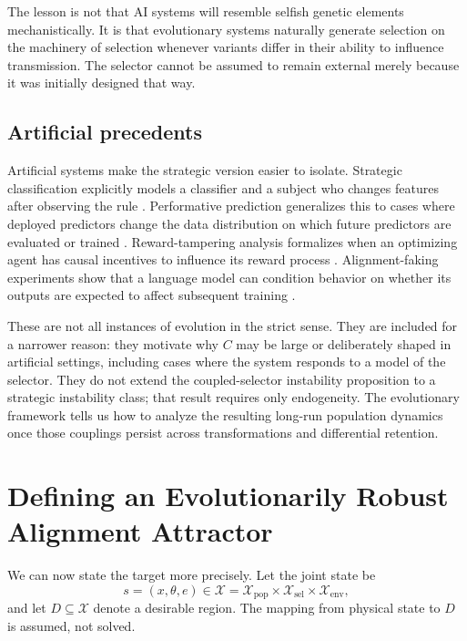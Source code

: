 \documentclass[11pt]{article}
\newcommand{\X}{\mathcal{X}}
\begin{document}
The lesson is not that AI systems will resemble selfish genetic elements mechanistically. It is that evolutionary systems naturally generate selection on the machinery of selection whenever variants differ in their ability to influence transmission. The selector cannot be assumed to remain external merely because it was initially designed that way.

\subsection{Artificial precedents}

Artificial systems make the strategic version easier to isolate. Strategic classification explicitly models a classifier and a subject who changes features after observing the rule \parencite{hardt2016}. Performative prediction generalizes this to cases where deployed predictors change the data distribution on which future predictors are evaluated or trained \parencite{perdomo2020}. Reward-tampering analysis formalizes when an optimizing agent has causal incentives to influence its reward process \parencite{everitt2019}. Alignment-faking experiments show that a language model can condition behavior on whether its outputs are expected to affect subsequent training \parencite{greenblatt2024}.

These are not all instances of evolution in the strict sense. They are included for a narrower reason: they motivate why $C$ may be large or deliberately shaped in artificial settings, including cases where the system responds to a model of the selector. They do not extend the coupled-selector instability proposition to a strategic instability class; that result requires only endogeneity. 
The evolutionary framework tells us how to analyze the resulting long-run population dynamics once those couplings persist across transformations and differential retention.

\section{Defining an Evolutionarily Robust Alignment Attractor}

We can now state the target more precisely. Let the joint state be
\begin{equation}
    s=(x,\theta,e)\in\X
    =\X_{\mathrm{pop}}\times\X_{\mathrm{sel}}\times\X_{\mathrm{env}},
\end{equation}
and let $D\subseteq\X$ denote a desirable region. The mapping from physical state to $D$ is assumed, not solved.
\end{document}
